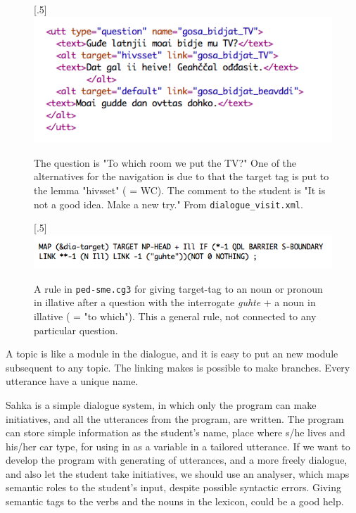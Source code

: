 \documentclass[a4paper,12pt]{article}
\begin{document}
\begin{figure}[htbp]
\begin{center}
\scalebox{.5}[.5]{\includegraphics{img/gosabidjatTV.png}}
\caption{The question is "To which room we put the TV?" One of the alternatives for the navigation is due to that the target tag is put to the lemma "hivsset" ( = WC). The comment to the student is "It is not a good idea. Make a new try." From \texttt{dialogue\_visit.xml}.}
\label{TV}
\end{center}
\end{figure}


\begin{figure}[htbp]
\begin{center}
\scalebox{.5}[.5]{\includegraphics{img/targetIll.png}}
\caption{A rule in \texttt{ped-sme.cg3} for giving target-tag to an noun or pronoun in illative after a question with the interrogate \textit{guhte} + a noun in illative ( = "to which"). This a general rule, not connected to any particular question.}
\label{targetIll}
\end{center}
\end{figure}

\newpage
A topic is like a module in the dialogue, and it is easy to put an new module subsequent to any topic. The linking makes is possible to make branches. Every utterance have a unique name.  

Sahka is a simple dialogue system, in which only the program can make initiatives, and all the utterances from the program, are written. The program can store simple information as the student's name, place where s/he lives and his/her car type, for using in as a variable in a tailored utterance. If we want to develop the program with generating of utterances, and a more freely dialogue, and also let the student take initiatives, we should use an analyser, which maps semantic roles to the student's input, despite possible syntactic errors. Giving semantic tags to the verbs and the nouns in the lexicon, could be a good help. 
\end{document}
